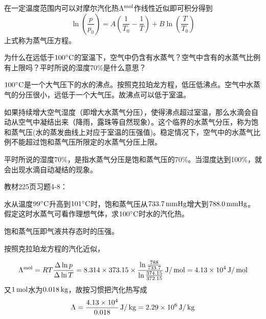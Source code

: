 \documentclass[CJK]{beamer}
\begin{document}
\begin{frame}
  \bch
  在一定温度范围内可以对摩尔汽化热$\Lambda^{\rm mol}$作线性近似即可积分得到
  $$\ln\left(\frac{p}{p_0}\right) = A\left(\frac{1}{T_0} - \frac{1}{T}\right) + B \ln\left(\frac{T}{T_0}\right)$$
  上式称为蒸气压方程。
  \ech
\end{frame}

\begin{frame}
  \chtitle{\proid (\sone)}
  \bch
  为什么在远低于$100^\circ \mathrm{C}$的室温下，空气中仍含有水蒸气？空气中含有的水蒸气比例有上限吗？平时所说的湿度70\%是什么意思？
  \ech
\end{frame}


\begin{frame}
  \bch
  $100^\circ \mathrm{C}$是一个大气压下的水的沸点。按照克拉珀龙方程，低压低沸点。空气中水蒸气的分压很小，远低于一个大气压。故沸点可以低于室温。

  \skipline

  如果持续增大空气湿度（即增大水蒸气分压），使得沸点超过室温，那么水滴会自动从空气中凝结出来（降雨，露珠等自然现象）。这个临界的水蒸气分压，称为饱和蒸气压(水的蒸发曲线上对应于室温的压强值)。稳定情况下，空气中的水蒸气比例不能超过饱和蒸气压所限定的水蒸气分压上限。

  \skipline
  
  平时所说的湿度70\%，是指水蒸气分压是饱和蒸气压的70\%。当湿度达到100\%，就会出现水滴自动凝结的现象。
  \ech
\end{frame}

\begin{frame}
  \chtitle{\proid (\sone)}
  \bch
  教材225页习题4-8：

  水从温度$99^\circ \mathrm{C}$升高到$101^\circ \mathrm{C}$时，饱和蒸气压从$733.7\,\mathrm{mmHg}$增大到$788.0\,\mathrm{mmHg}$。假定这时水蒸气可看作理想气体，求$100^\circ \mathrm{C}$时水的汽化热。
  \ech
\end{frame}


\begin{frame}
  \bch
  {\small
  饱和蒸气压即气液共存态时的压强。
  
  按照克拉珀龙方程的汽化近似，
  
  $$\Lambda^{\rm mol} = RT \frac{\Delta \ln p}{\Delta \ln T} = 8.314\times 373.15 \times \frac{\ln\frac{788}{733.7}}{\ln\frac{374.15}{372.15}} \,\mathrm{J}/\,\mathrm{mol} = 4.13\times 10^4 \,\mathrm{J}/\,\mathrm{mol}$$
  又$1\,\mathrm{mol}$水为$0.018\,\mathrm{kg}$，故按习惯把汽化热写成
  $$ \Lambda = \frac{4.13\times 10^4}{0.018} \,\mathrm{J}/\,\mathrm{kg} = 2.29\times 10^6 \,\mathrm{J}/\,\mathrm{kg}$$
  }
  \ech
\end{frame}
\end{document}
